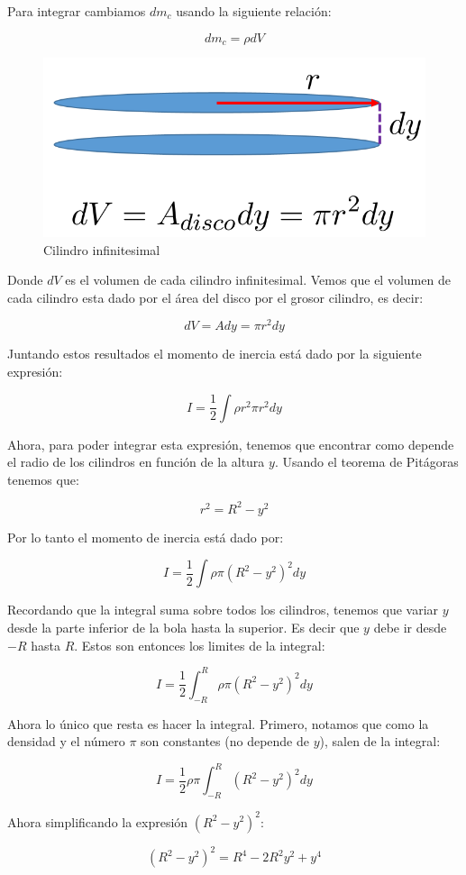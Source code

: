 \documentclass[a4paper,11pt]{article}
\theoremstyle{mytheor}
\begin{document}
Para integrar cambiamos $dm_c$ usando la siguiente relación:

$$ dm_c = \rho dV$$

\begin{figure}[h]
	\includegraphics[width=0.7\linewidth]{elmentovolbola}
	\caption{Cilindro infinitesimal}
	\label{fcN4}
\end{figure}

Donde $dV$ es el volumen de cada cilindro infinitesimal. Vemos que el volumen de cada cilindro esta dado por el área del disco por el grosor cilindro, es decir:

$$ dV = A dy = \pi r^2 d y$$

Juntando estos resultados el momento de inercia está dado por la siguiente expresión:
 
$$ I = \frac{1}{2} \int \rho r^2 \pi r^2 dy$$

Ahora, para poder integrar esta expresión, tenemos que encontrar como depende el radio de los cilindros en función de la altura $y$. Usando el teorema de Pitágoras tenemos que:

$$ r^2 = R^2 - y^2$$

Por lo tanto el momento de inercia está dado por:

$$ I = \frac{1}{2} \int \rho \pi   (R^2-y^2)^2 dy$$

Recordando que la integral suma sobre todos los cilindros, tenemos que variar $y$ desde la parte inferior de la bola hasta la superior. Es decir que $y$ debe ir desde $-R$ hasta $R$. Estos son entonces los limites de la integral:


$$ I = \frac{1}{2} \int_{-R}^{R} \rho \pi   (R^2-y^2)^2 dy$$

Ahora lo único que resta es hacer la integral. Primero, notamos que como la densidad y el número $\pi$ son constantes (no depende de $y$), salen de la integral:


$$ I = \frac{1}{2} \rho \pi \int_{-R}^{R}    (R^2-y^2)^2 dy$$

Ahora simplificando la expresión $(R^2-y^2)^2$:

$$ (R^2-y^2)^2 = R^4 -2 R^2 y^2 + y^4$$
\end{document}
